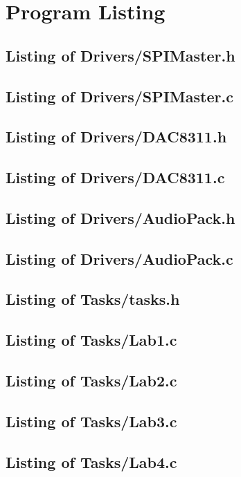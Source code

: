 \documentclass[titlepage]{article}
\begin{document}
\section{Program Listing}
\subsection{Listing of Drivers/SPIMaster.h}

\subsection{Listing of Drivers/SPIMaster.c}

\subsection{Listing of Drivers/DAC8311.h}

\subsection{Listing of Drivers/DAC8311.c}

\subsection{Listing of Drivers/AudioPack.h}

\subsection{Listing of Drivers/AudioPack.c}

\subsection{Listing of Tasks/tasks.h}

\subsection{Listing of Tasks/Lab1.c}

\subsection{Listing of Tasks/Lab2.c}

\subsection{Listing of Tasks/Lab3.c}

\subsection{Listing of Tasks/Lab4.c}

\end{document}
